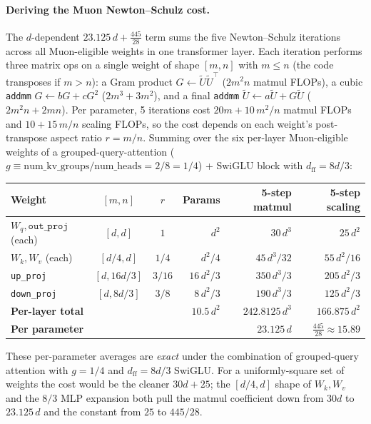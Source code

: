\documentclass{article}
\begin{document}
\paragraph{Deriving the Muon Newton--Schulz cost.} The $d$-dependent $23.125\,d + \tfrac{445}{28}$ term sums the five Newton--Schulz iterations across all Muon-eligible weights in one transformer layer. Each iteration performs three matrix ops on a single weight of shape $[m, n]$ with $m \le n$ (the code transposes if $m > n$): a Gram product $G \leftarrow \tilde U \tilde U^\top$ ($2 m^2 n$ matmul FLOPs), a cubic \texttt{addmm} $G \leftarrow b G + c G^2$ ($2 m^3 + 3 m^2$), and a final \texttt{addmm} $\tilde U \leftarrow a \tilde U + G \tilde U$ ($2 m^2 n + 2 m n$). Per parameter, 5 iterations cost $20 m + 10\,m^2/n$ matmul FLOPs and $10 + 15\,m/n$ scaling FLOPs, so the cost depends on each weight's post-transpose aspect ratio $r = m/n$. Summing over the six per-layer Muon-eligible weights of a grouped-query-attention ($g \equiv \text{num\_kv\_groups}/\text{num\_heads} = 2/8 = 1/4$) + SwiGLU block with $d_{\text{ff}} = 8 d/3$:

\begin{center}
\begin{tabular}{l c c r r r}
\toprule
Weight & $[m, n]$ & $r$ & Params & 5-step matmul & 5-step scaling \\
\midrule
$W_q, \texttt{out\_proj}$ (each) & $[d, d]$ & $1$ & $d^2$ & $30\,d^3$ & $25\,d^2$ \\
$W_k, W_v$ (each) & $[d/4, d]$ & $1/4$ & $d^2/4$ & $45\,d^3/32$ & $55\,d^2/16$ \\
\texttt{up\_proj} & $[d, 16d/3]$ & $3/16$ & $16\,d^2/3$ & $350\,d^3/3$ & $205\,d^2/3$ \\
\texttt{down\_proj} & $[d, 8d/3]$ & $3/8$ & $8\,d^2/3$ & $190\,d^3/3$ & $125\,d^2/3$ \\
\midrule
\textbf{Per-layer total} & & & $10.5\,d^2$ & $242.8125\,d^3$ & $166.875\,d^2$ \\
\textbf{Per parameter} & & & & $23.125\,d$ & $\tfrac{445}{28} \approx 15.89$ \\
\bottomrule
\end{tabular}
\end{center}

These per-parameter averages are \emph{exact} under the combination of grouped-query attention with $g = 1/4$ and $d_{\text{ff}} = 8 d / 3$ SwiGLU. For a uniformly-square set of weights the cost would be the cleaner $30 d + 25$; the $[d/4, d]$ shape of $W_k, W_v$ and the $8/3$ MLP expansion both pull the matmul coefficient down from $30 d$ to $23.125\,d$ and the constant from $25$ to $445/28$.
\end{document}
